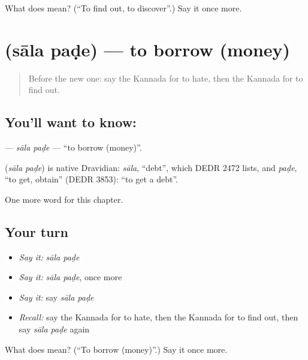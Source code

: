\begin{tcolorbox}[breakable,colback=teal!4,colframe=teal!35!black,title={Before you move on}]
What does  mean? (\textquotedblleft{}To find out, to discover\textquotedblright{}.) Say it once more.
\end{tcolorbox}
\section[\texorpdfstring{\kn{ಸಾಲ} \kn{ಪಡೆ} (sāla paḍe)}{ಸಾಲ ಪಡೆ (sāla paḍe)}]{  (sāla paḍe) — to borrow (money)}

\label{lesson:KA-C241-sala-pade}



\begin{quote}
Before the new one: say the Kannada for to hate, then the Kannada for to find out.
\end{quote}

\subsection*{You'll want to know:  }
\textbf{ } — \emph{sāla paḍe} — \textquotedblleft{}to borrow (money)\textquotedblright{}.

\begin{cousinweb}
\textbf{ } (\emph{sāla paḍe}) is native Dravidian: \emph{sāla}, \textquotedblleft{}debt\textquotedblright{}, which DEDR 2472 lists, and \emph{paḍe}, \textquotedblleft{}to get, obtain\textquotedblright{} (DEDR 3853): \textquotedblleft{}to get a debt\textquotedblright{}.
\end{cousinweb}

\begin{grammarlens}[title={What you've built}]
One more word for this chapter.
\end{grammarlens}

\subsection*{Your turn}
\begin{itemize}
\raggedright
  \item \emph{Say it:} \emph{sāla paḍe}
  \item \emph{Say it:} \emph{sāla paḍe}, once more
  \item \emph{Say it:} say \emph{sāla paḍe}
  \item \emph{Recall:} say the Kannada for to hate, then the Kannada for to find out, then say \emph{sāla paḍe} again
\end{itemize}

\begin{tcolorbox}[breakable,colback=teal!4,colframe=teal!35!black,title={Before you move on}]
What does   mean? (\textquotedblleft{}To borrow (money)\textquotedblright{}.) Say it once more.
\end{tcolorbox}
